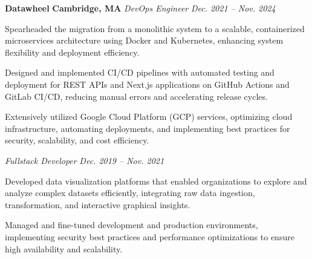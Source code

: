 \item
\headerrow
{\textbf{Datawheel}}
{\textbf{Cambridge, MA}}
\headerrow
{\emph{DevOps Engineer}}
{\emph{Dec. 2021 -- Nov. 2024}}
\begin{itemize*}
    \item Spearheaded the migration from a monolithic system to a scalable,
    containerized microservices architecture using Docker and Kubernetes,
    enhancing system flexibility and deployment efficiency.
    \item Designed and implemented CI/CD pipelines with automated testing and
    deployment for REST APIs and Next.js applications on GitHub Actions and
    GitLab CI/CD, reducing manual errors and accelerating release cycles.
    \item Extensively utilized Google Cloud Platform (GCP) services, optimizing cloud
    infrastructure, automating deployments, and implementing best practices for
    security, scalability, and cost efficiency.
\end{itemize*}
\headerrow
{\emph{Fullstack Developer}}
{\emph{Dec. 2019 -- Nov. 2021}}
\begin{itemize*}
    \item Developed data visualization platforms that enabled organizations to explore
    and analyze complex datasets efficiently, integrating raw data ingestion,
    transformation, and interactive graphical insights.
    \item Managed and fine-tuned development and production environments,
    implementing security best practices and performance optimizations to ensure
    high availability and scalability.
\end{itemize*}